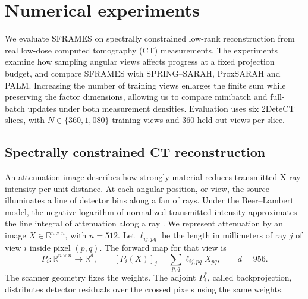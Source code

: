 \section{Numerical experiments}
\label{sec:ct-experiments}

We evaluate SFRAMES on spectrally constrained low-rank reconstruction from
real low-dose computed tomography (CT) measurements. The experiments examine
how sampling angular views affects progress at a fixed projection budget,
and compare SFRAMES with SPRING--SARAH, ProxSARAH and PALM. Increasing the
number of training views enlarges the finite sum while preserving the factor
dimensions, allowing us to compare minibatch and full-batch updates under
both measurement densities.
Evaluation uses six 2DeteCT slices, with \(N\in\{360,1{,}080\}\) training
views and \(360\) held-out views per slice.

\subsection{Spectrally constrained CT reconstruction}
\label{subsec:ct-model}

An attenuation image describes how strongly material reduces transmitted
X-ray intensity per unit distance. At each angular position, or view, the
source illuminates a line of detector bins along a fan of rays. Under the
Beer--Lambert model, the negative logarithm of normalized transmitted
intensity approximates the line integral of attenuation along a ray
\cite{detect}. We represent attenuation by an image
\(X\in\mathbb R^{n\times n}\), with \(n=512\). Let
\(\ell_{ij,pq}\) be the length in millimeters of ray \(j\) of view \(i\)
inside pixel \((p,q)\). The forward map for that view is
\begin{equation}
 P_i\colon\mathbb R^{n\times n}\longrightarrow\mathbb R^d,
 \qquad [P_i(X)]_j=\sum_{p,q}\ell_{ij,pq}X_{pq},\qquad d=956.
 \label{eq:ct-ray}
\end{equation}
The scanner geometry fixes the weights. The adjoint \(P_i^\ast\), called
backprojection, distributes detector residuals over the crossed pixels
using the same weights.

